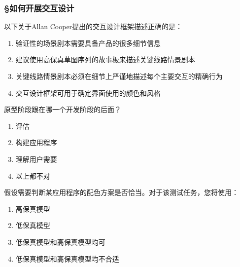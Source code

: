 \subsubsection*{\S 如何开展交互设计}
\setcounter{problemname}{0}

\begin{problem}
	以下关于Allan Cooper提出的交互设计框架描述正确的是：
        \begin{enumerate}[label=\Alph*.]
            \item 验证性的场景剧本需要具备产品的很多细节信息
            \item 建议使用高保真草图序列的故事板来描述关键线路情景剧本
            \item 关键线路情景剧本必须在细节上严谨地描述每个主要交互的精确行为
            \item 交互设计框架可用于确定界面使用的颜色和风格
        \end{enumerate}
\end{problem}



\begin{problem}
	原型阶段跟在哪一个开发阶段的后面？
    \vspace{-0.8em}
    \begin{multicols}{4}
        \begin{enumerate}[label=\Alph*.]
            \item 评估
            \item 构建应用程序
            \item 理解用户需要
            \item 以上都不对
        \end{enumerate}
    \end{multicols}
    \vspace{-1em}
\end{problem}



\begin{problem}
	假设需要判断某应用程序的配色方案是否恰当。对于该测试任务，您将使用：
    \vspace{-0.8em}
    \begin{multicols}{2}
        \begin{enumerate}[label=\Alph*.]
            \item 高保真模型
            \item 低保真模型
            \item 低保真模型和高保真模型均可
            \item 低保真模型和高保真模型均不合适
        \end{enumerate}
    \end{multicols}
    \vspace{-1em}
\end{problem}



